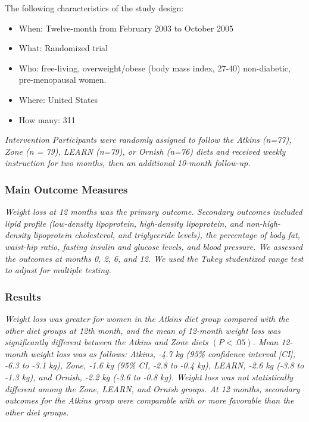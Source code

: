 \documentclass[11pt]{book}\usepackage[]{graphicx}\usepackage[]{color}
\begin{document}
\vspace{3mm}

The following characteristics of the study design:
 
\begin{itemize}
\item When: Twelve-month from February 2003 to October 2005
\item What: Randomized trial
\item Who: free-living, overweight/obese (body mass index, 27-40) non-diabetic, \\ pre-menopausal women.
\item Where: United States
\item How many: 311
\end{itemize}

\textit{Intervention Participants were randomly assigned to follow the Atkins (n=77), Zone (n = 79), LEARN (n=79), or Ornish (n=76) diets and received weekly instruction for two months, then an additional 10-month follow-up.}

\subsubsection{Main Outcome Measures}

\textit{Weight loss at 12 months was the primary outcome.  Secondary outcomes included lipid profile (low-density lipoprotein, high-density lipoprotein, and non-high-density lipoprotein cholesterol, and triglyceride levels), the percentage of body fat, waist-hip ratio, fasting insulin and glucose levels, and blood pressure. We assessed the outcomes at months 0, 2, 6, and 12. We used the Tukey studentized range test to adjust for multiple testing.}

\subsubsection{Results}

\textit{Weight loss was greater for women in the Atkins diet group compared with the other diet groups at 12th month, and the mean of 12-month weight loss was significantly different between the Atkins and Zone diets $(P<.05)$. Mean 12-month weight loss was as follows: Atkins, -4.7 kg (95\% confidence interval [CI], -6.3 to -3.1 kg), Zone, -1.6 kg (95\% CI, -2.8 to -0.4 kg), LEARN, -2.6 kg (-3.8 to -1.3 kg), and Ornish, -2.2 kg (-3.6 to -0.8 kg). Weight loss was not statistically different among the Zone, LEARN, and Ornish groups. At 12 months, secondary outcomes for the Atkins group were comparable with or more favorable than the other diet groups.}
\end{document}

